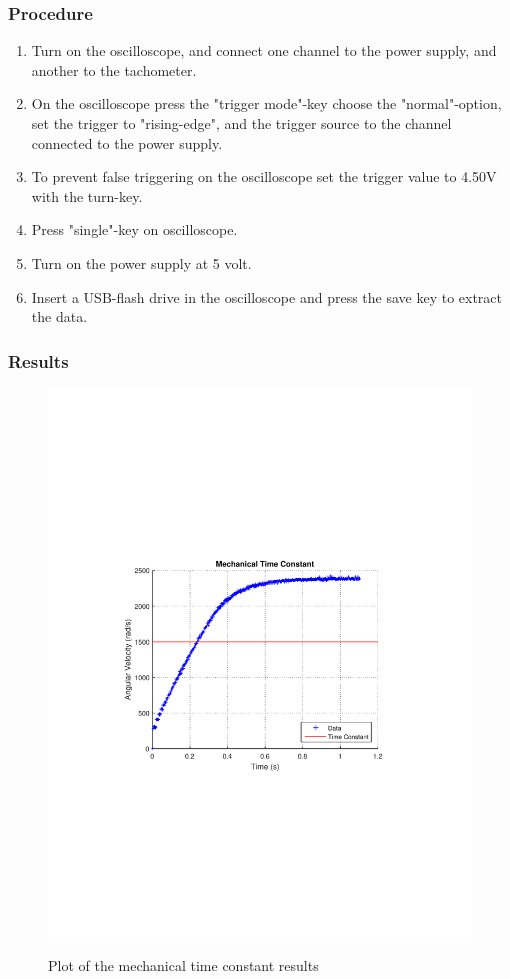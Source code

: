 \subsubsection{Procedure}

\begin{enumerate}
  \item Turn on the oscilloscope, and connect one channel to the power supply, and another to the tachometer.
  \item On the oscilloscope press the "trigger mode"-key choose the "normal"-option, set the trigger to "rising-edge", and the trigger source to the channel connected to the power supply.
  \item To prevent false triggering on the oscilloscope set the trigger value to \num{4,50}V with the turn-key.
  \item Press "single"-key on oscilloscope.
  \item Turn on the power supply at 5 volt.
  \item Insert a USB-flash drive in the oscilloscope and press the save key to extract the data.
\end{enumerate}

\subsubsection{Results}

\begin{figure}[H]
  \centering
  {
    \includegraphics[width=.8\textwidth]{figures/mechanicalTimeConstant.pdf}
  }
	\caption{Plot of the mechanical time constant results}
	\label{mechanicalTimeConstant}
\end{figure}

